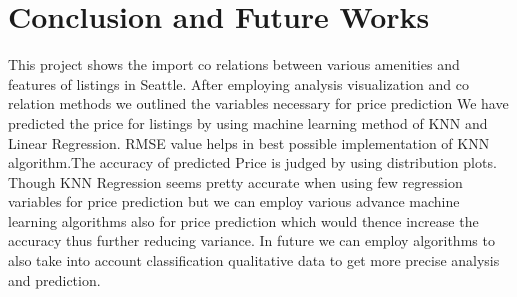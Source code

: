 \section{Conclusion and Future Works}

\begin{block}
\color{gray}
This project shows the import co relations between various amenities and features of listings in Seattle.
After employing analysis visualization and co relation methods we outlined the variables necessary for price prediction
We have predicted the price for listings by using machine learning method of KNN and Linear Regression. RMSE value helps in best possible implementation of KNN algorithm.The accuracy of predicted Price is judged by using distribution plots.
Though KNN Regression seems pretty accurate when using few regression variables for price prediction but we can employ various advance machine learning algorithms also for price prediction which would thence increase the accuracy thus further reducing variance. 
In future we can employ algorithms to also take into account classification qualitative data to get more precise analysis and prediction.

\end{block}